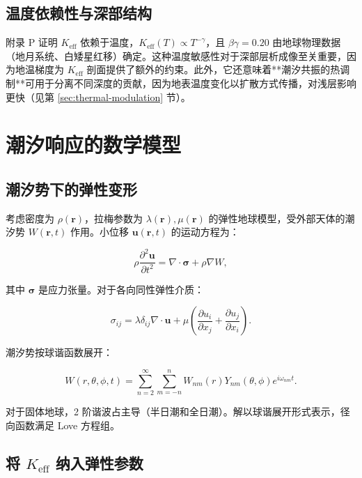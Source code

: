 \documentclass[12pt,a4paper]{article}
\theoremstyle{remark}
\newcommand{\Keff}{K_{\mathrm{eff}}}
\begin{document}
	\subsection{温度依赖性与深部结构}
	
	附录 P 证明 $\Keff$ 依赖于温度，$\Keff(T) \propto T^{-\gamma}$，且 $\beta\gamma = 0.20$ 由地球物理数据（地月系统、白矮星红移）确定。这种温度敏感性对于深部层析成像至关重要，因为地温梯度为 $K_{\mathrm{eff}}$ 剖面提供了额外的约束。此外，它还意味着**潮汐共振的热调制**可用于分离不同深度的贡献，因为地表温度变化以扩散方式传播，对浅层影响更快（见第 \ref{sec:thermal-modulation} 节）。
	
	\section{潮汐响应的数学模型}
	\label{sec:model}
	
	\subsection{潮汐势下的弹性变形}
	
	考虑密度为 $\rho(\mathbf{r})$，拉梅参数为 $\lambda(\mathbf{r}), \mu(\mathbf{r})$ 的弹性地球模型，受外部天体的潮汐势 $W(\mathbf{r},t)$ 作用。小位移 $\mathbf{u}(\mathbf{r},t)$ 的运动方程为：
	
	\begin{equation}
		\rho \frac{\partial^2 \mathbf{u}}{\partial t^2} = \nabla \cdot \boldsymbol{\sigma} + \rho \nabla W,
		\label{eq:motion}
	\end{equation}
	
	其中 $\boldsymbol{\sigma}$ 是应力张量。对于各向同性弹性介质：
	
	\begin{equation}
		\sigma_{ij} = \lambda \delta_{ij} \nabla \cdot \mathbf{u} + \mu \left(\frac{\partial u_i}{\partial x_j} + \frac{\partial u_j}{\partial x_i}\right).
		\label{eq:stress}
	\end{equation}
	
	潮汐势按球谐函数展开：
	
	\begin{equation}
		W(r,\theta,\phi,t) = \sum_{n=2}^{\infty} \sum_{m=-n}^{n} W_{nm}(r) Y_{nm}(\theta,\phi) e^{i\omega_{nm}t}.
		\label{eq:tidal-potential}
	\end{equation}
	
	对于固体地球，2 阶谐波占主导（半日潮和全日潮）。解以球谐展开形式表示，径向函数满足 Love 方程组。
	
	\subsection{将 $\Keff$ 纳入弹性参数}
	
\end{document}
